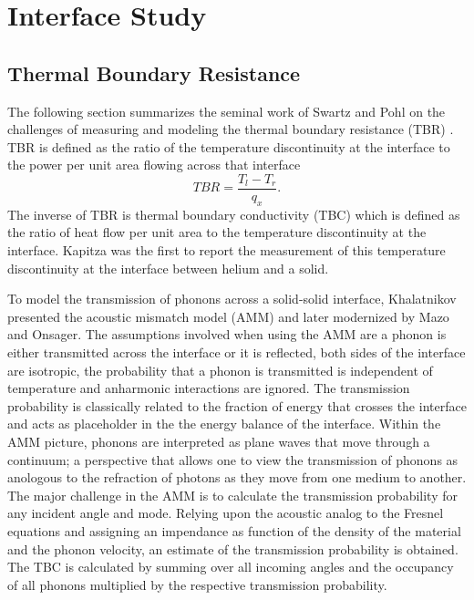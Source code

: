 \chapter{Interface Study}

\section{Thermal Boundary Resistance}
The following section summarizes the seminal work of Swartz and Pohl on the challenges of measuring and modeling the thermal boundary resistance (TBR) \cite{RevModPhys.61.605}. TBR is defined as the ratio of the temperature discontinuity at the interface to the power per unit area flowing across that interface
\begin{equation}
TBR=\frac{T_l-T_r}{q_x}.
\end{equation}
The inverse of TBR is thermal boundary conductivity (TBC) which is defined as the ratio of heat flow per unit area to the temperature discontinuity at the interface. Kapitza was the first to report the measurement of this temperature discontinuity at the interface between helium and a solid.

To model the transmission of phonons across a solid-solid interface, Khalatnikov presented the acoustic mismatch model (AMM) and later modernized by Mazo and Onsager. The assumptions involved when using the AMM are a phonon is either transmitted across the interface or it is reflected, both sides of the interface are isotropic, the probability that a phonon is transmitted is independent of temperature and anharmonic interactions are ignored. The transmission probability is classically related to the fraction of energy that crosses the interface and acts as placeholder in the the energy balance of the interface. Within the AMM picture, phonons are interpreted as plane waves that move through a continuum; a perspective that allows one to view the transmission of phonons as anologous to the refraction of photons as they move from one medium to another. The major challenge in the AMM is to calculate the transmission probability for any incident angle and mode. Relying upon the acoustic analog to the Fresnel equations and assigning an impendance as function of the density of the material and the phonon velocity, an estimate of the transmission probability is obtained. The TBC is calculated by summing over all incoming angles and the occupancy of all phonons multiplied by the respective transmission probability.

